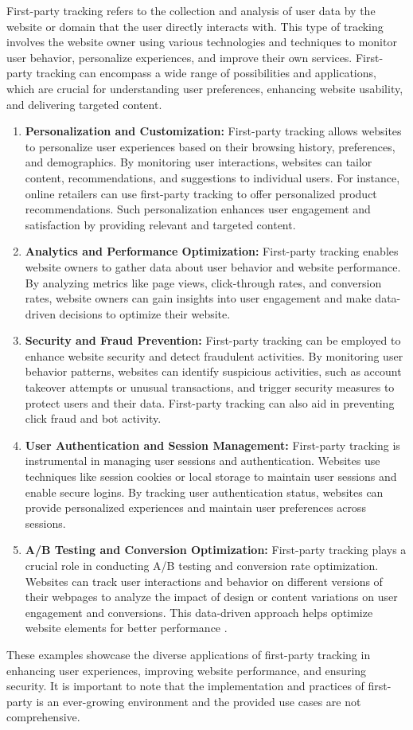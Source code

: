First-party tracking refers to the collection and analysis of user data by the website or domain that the user directly
interacts with. This type of tracking involves the website owner using various technologies and techniques to monitor user
behavior, personalize experiences, and improve their own services. First-party tracking can encompass a wide range of
possibilities and applications, which are crucial for understanding user preferences, enhancing website usability,
and delivering targeted content.
\begin{enumerate}
  \item{\textbf{Personalization and Customization:} First-party tracking allows websites to personalize user experiences based on their browsing history,
    preferences, and demographics. By monitoring user interactions, websites can tailor content,
    recommendations, and suggestions to individual users. For instance, online retailers can use first-party
    tracking to offer personalized product recommendations. Such personalization enhances user engagement
    and satisfaction by providing relevant and targeted content.
    }
  \item{\textbf{Analytics and Performance Optimization:} First-party tracking enables website owners to gather data about user behavior and website performance.
    By analyzing metrics like page views, click-through rates, and conversion rates, website owners can gain
    insights into user engagement and make data-driven decisions to optimize their website.
    }
  \item{\textbf{Security and Fraud Prevention:} First-party tracking can be employed to enhance website security and detect fraudulent
    activities. By monitoring user behavior patterns, websites can identify suspicious activities, such as account takeover
    attempts or unusual transactions, and trigger security measures to protect users and their data.
    First-party tracking can also aid in preventing click fraud and bot activity.
  }
  \item{\textbf{User Authentication and Session Management:} First-party tracking is instrumental in managing user sessions and authentication.
    Websites use techniques like session cookies or local storage to maintain user sessions and enable secure logins.
    By tracking user authentication status, websites can provide personalized experiences and maintain user preferences across sessions.
  }
  \item{\textbf{A/B Testing and Conversion Optimization:} First-party tracking plays a crucial role in conducting A/B testing and
    conversion rate optimization. Websites can track user interactions and behavior on different versions of their webpages
    to analyze the impact of design or content variations on user engagement and conversions. This data-driven approach
    helps optimize website elements for better performance \cite{siroker2015b}.
  }
\end{enumerate}
These examples showcase the diverse applications of first-party tracking in enhancing user experiences, improving website performance,
and ensuring security. It is important to note that the implementation and practices of first-party is an ever-growing environment and the 
provided use cases are not comprehensive.
